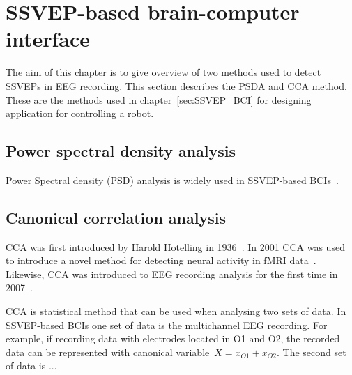 \section{SSVEP-based brain-computer interface}
\label{sec:SSVEP_detection}
The aim of this chapter is to give overview of two methods used to detect \glspl{SSVEP} in \gls{EEG} recording. 
This section describes the \gls{PSDA} and \gls{CCA} method. These are the methods used in chapter~\ref{sec:SSVEP_BCI} for designing application for controlling a robot. 

\subsection{Power spectral density analysis}

Power Spectral density (PSD) analysis is widely used in \gls{SSVEP}-based \glspl{BCI}~\cite{bin2009cca}.

\subsection{Canonical correlation analysis}

\Gls{CCA} was first introduced by Harold Hotelling in 1936~\cite{cca_hotelling}. In 2001 \gls{CCA} was used to introduce a novel method for detecting neural activity in \gls{fMRI} data~\cite{cca_fmri}. Likewise, \gls{CCA} was introduced to \gls{EEG} recording analysis for the first time in 2007~\cite{cca_lin}. 

\Gls{CCA} is statistical method that can be used when analysing two sets of data. In \gls{SSVEP}-based \glspl{BCI} one set of data is the multichannel \gls{EEG} recording. For example, if recording data with electrodes located in O1 and O2, the recorded data can be represented with canonical variable~$X=x_{O1}+x_{O2}$. The second set of data is ...
